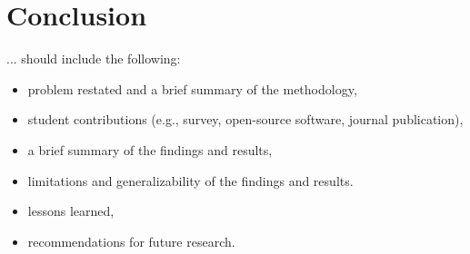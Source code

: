 \chapter{Conclusion\label{cha:chapter6}}
... should include the following:
\begin{itemize}

\item problem restated and a brief summary of the methodology,
\item student contributions (e.g., survey, open-source software, journal publication),
\item a brief summary of the findings and results,
\item limitations and generalizability of the findings and results.
\item lessons learned,
\item recommendations for future research.

\end{itemize}

